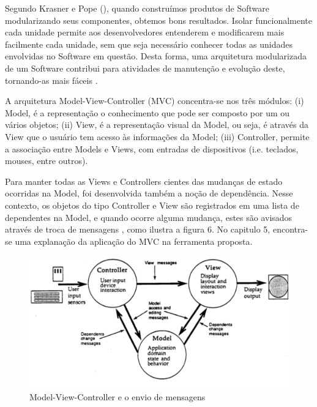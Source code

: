 Segundo Krasner e Pope (\citeyear{krasner1988}), quando construímos produtos de Software modularizando seus componentes, obtemos bons resultados. Isolar funcionalmente cada unidade permite aos desenvolvedores entenderem e modificarem mais facilmente cada unidade, sem que seja necessário conhecer todas as unidades envolvidas no Software em questão. Desta forma, uma arquitetura modularizada de um Software contribui para atividades de manutenção e evolução deste, tornando-as mais fáceis \cite[p. 1]{krasner1988}.


A arquitetura Model-View-Controller (MVC) concentra-se nos três módulos: (i) Model, é a representação o conhecimento que pode ser composto por um ou vários objetos; (ii) View, é a representação visual da Model, ou seja, é através da View que o usuário tem acesso às informações da Model; (iii) Controller, permite a associação entre Models e Views, com entradas de dispositivos (i.e. teclados, mouses, entre outros)\cite[p. 2]{krasner1988}.



Para manter todas as Views e Controllers cientes das mudanças de estado ocorridas na Model, foi desenvolvida também a noção de dependência. Nesse contexto, os objetos do tipo Controller e View são registrados em uma lista de dependentes na Model, e quando ocorre alguma mudança, estes são avisados através de troca de mensagens \cite[p. 2]{krasner1988}, como ilustra a figura 6. No capitulo 5, encontra-se uma explanação da aplicação do MVC na ferramenta proposta.

\begin{figure}[h]
\centering
\label{f06}
\includegraphics[width=1\textwidth]{figuras/f06}
\caption{Model-View-Controller e o envio de mensagens}

\end{figure}



